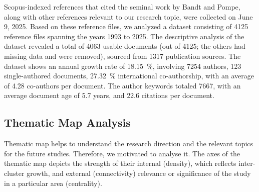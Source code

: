 Scopus-indexed references that cited the seminal work by Bandt and Pompe, along with other references relevant to our research topic, were collected on June 9, 2025.
Based on these reference files, we analyzed a dataset consisting of 4125 reference files spanning the years 1993 to 2025. %
The descriptive analysis of the dataset revealed a total of 4063 usable documents (out of 4125; the others had missing data and were removed), sourced from 1317 
publication sources. 
The dataset shows an annual growth rate of \SI{18.15}{\percent}, %
involving 7254 authors, 
123 single-authored documents, 
\SI{27.32}{\percent} international co-authorship, 
with an average of 4.28 co-authors per document. 
The author keywords totaled 7667, 
with an average document age of 5.7 years, %
and 22.6 citations per document. 

\subsection{Thematic Map Analysis}

Thematic map helps to understand the research direction and the relevant topics for the future studies. Therefore, we motivated to analyse it. The axes of the thematic map depicts the strength of their internal (density), which reflects inter-cluster growth, and external (connectivity) relevance or significance of the study in a particular area (centrality). 

